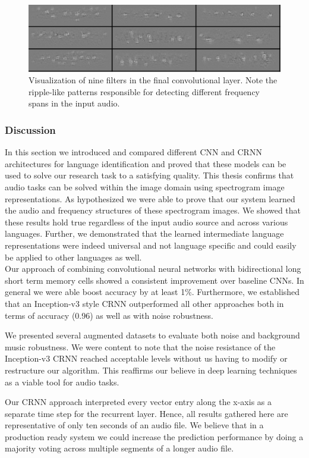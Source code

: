 	\begin{figure}[h]
  		\centering
    	\includegraphics[width=\textwidth, keepaspectratio]{img/conv_filter.png}
    	\caption{Visualization of nine filters in the final convolutional layer. Note the ripple-like patterns responsible for detecting different frequency spans in the input audio.}
    	\label{fig:conv_filter}
	\end{figure}

\subsubsection{Discussion} 
\label{sec:comparison}
In this section we introduced and compared different CNN and CRNN architectures for language identification and proved that these models can be used to solve our research task to a satisfying quality. This thesis confirms that audio tasks can be solved within the image domain using spectrogram image representations. As hypothesized we were able to prove that our system learned the audio and frequency structures of these spectrogram images. We showed that these results hold true regardless of the input audio source and across various languages. Further, we  demonstrated that the learned intermediate language representations were indeed universal and not language specific and could easily be applied to other languages as well.\\
 Our approach of combining convolutional neural networks with bidirectional long short term memory cells showed a consistent improvement over baseline CNNs. In general we were able boost accuracy by at least 1\%. Furthermore, we established that an Inception-v3 style CRNN outperformed all other approaches both in terms of accuracy (0.96) as well as with noise robustness. 

We presented several augmented datasets to evaluate both noise and background music robustness. We were content to note that the noise resistance of the Inception-v3 CRNN reached acceptable levels without us having to modify or restructure our algorithm. This reaffirms our believe in deep learning techniques as a viable tool for audio tasks.

Our CRNN approach interpreted every vector entry along the x-axis as a separate time step for the recurrent layer. Hence, all results gathered here are representative of only ten seconds of an audio file. We believe that in a production ready system we could increase the prediction performance by doing a majority voting across multiple segments of a longer audio file. 


